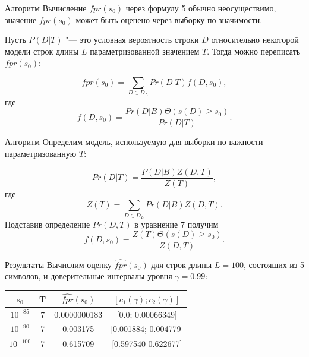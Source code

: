 \documentclass{beamer}
\begin{document}
	\begin{frame}{Алгоритм}
		Вычисление $fpr(s_{0})$ через формулу 5 обычно неосуществимо, значение $fpr(s_{0})$ может быть оценено через выборку по значимости. 
		
		\vspace{0.5cm}
		
		Пусть $P(D|T)$ "--- это условная вероятность строки $D$ относительно некоторой модели строк длины $L$ параметризованной значением $T$. Тогда можно переписать $fpr(s_{0})$:		
		
		\begin{equation}
			fpr(s_{0}) = \sum_{D \in D_{L}} Pr(D|T) f(D,s_{0}),
		\end{equation}
		где
		\begin{equation}
			f(D,s_{0}) = \frac{Pr(D|B) \Theta(s(D) \geq s_{0})}{Pr(D|T)}.
		\end{equation}				
	\end{frame}

	\begin{frame}{Алгоритм}
		Определим модель, используемую для выборки по важности параметризованную $T$:		
		
		\begin{equation}
			Pr(D|T) = \frac{P(D|B)Z(D,T)}{Z(T)},
		\end{equation}							
		где 
		\begin{equation}
			Z(T) = \sum_{D \in D_{L}}Pr(D|B)Z(D,T).
		\end{equation}
		Подставив определение $Pr(D,T)$ в уравнение 7 получим
		\begin{equation}
			f(D,s_{0}) = \frac{Z(T)\Theta(s(D) \geq s_{0})}{Z(D,T)}.
		\end{equation}	
	\end{frame}

	\begin{frame}{Результаты}
		Вычислим оценку $\widehat{fpr}(s_{0})$ для строк длины $L=100$, состоящих из 5 символов, и доверительные интервалы уровня $\gamma = 0.99$:
		\begin{center}
			\begin{tabular}{cccc}
				$s_{0}$&T&$\widehat{fpr}(s_{0})$&$[c_{1}(\gamma);c_{2}(\gamma)]$  \\ \hline
				$10^{-85}$&7&0.0000000183&[0.0; 0.00066349] \\
				$10^{-90}$&7&0.003175&[0.001884; 0.004779] \\ 
				$10^{-100}$&7&0.615709&[0.597540 0.622677] \\
			\end{tabular}
		\end{center}
	\end{frame}
\end{document}
